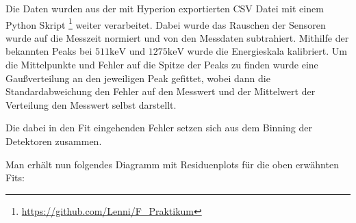 \documentclass[12pt,twoside,a4paper]{scrartcl}
\begin{document}
		Die Daten wurden aus der mit Hyperion exportierten CSV Datei mit einem Python Skript \footnote{\url{https://github.com/Lenni/F_Praktikum}} weiter verarbeitet. Dabei wurde das Rauschen der Sensoren wurde auf die Messzeit normiert und von den Messdaten subtrahiert. Mithilfe der bekannten Peaks bei $511 \si{\kilo \electronvolt}$ und $1275 \si{\kilo \electronvolt}$ wurde die Energieskala kalibriert. Um die Mittelpunkte und Fehler auf die Spitze der Peaks zu finden wurde eine Gaußverteilung an den jeweiligen Peak gefittet, wobei dann die Standardabweichung den Fehler auf den Messwert und der Mittelwert der Verteilung den Messwert selbst darstellt.

		Die dabei in den Fit eingehenden Fehler setzen sich aus dem Binning der Detektoren zusammen.

		Man erhält nun folgendes Diagramm mit Residuenplots für die oben erwähnten Fits:
\end{document}
